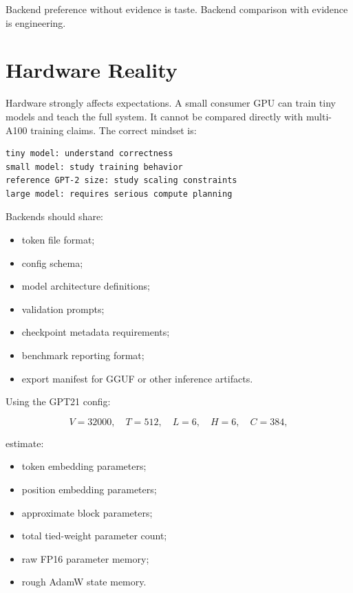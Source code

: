 Backend preference without evidence is taste. Backend comparison with evidence is
engineering.

\section{Hardware Reality}

Hardware strongly affects expectations. A small consumer GPU can train tiny models and
teach the full system. It cannot be compared directly with multi-A100 training claims.
The correct mindset is:

\begin{lstlisting}
tiny model: understand correctness
small model: study training behavior
reference GPT-2 size: study scaling constraints
large model: requires serious compute planning
\end{lstlisting}

\engineering

Backends should share:

\begin{itemize}
  \item token file format;
  \item config schema;
  \item model architecture definitions;
  \item validation prompts;
  \item checkpoint metadata requirements;
  \item benchmark reporting format;
  \item export manifest for GGUF or other inference artifacts.
\end{itemize}


Using the GPT21 config:

\[
V=32000,\quad T=512,\quad L=6,\quad H=6,\quad C=384,
\]

estimate:

\begin{itemize}
  \item token embedding parameters;
  \item position embedding parameters;
  \item approximate block parameters;
  \item total tied-weight parameter count;
  \item raw FP16 parameter memory;
  \item rough AdamW state memory.
\end{itemize}

